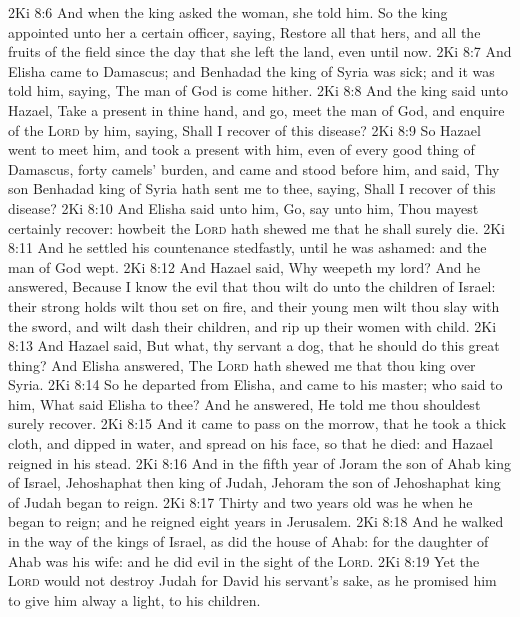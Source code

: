 \vs 2Ki 8:6 And when the king asked the woman, she told him. So the king appointed unto her a certain officer, saying, Restore all that  hers, and all the fruits of the field since the day that she left the land, even until now.
\vs 2Ki 8:7 And Elisha came to Damascus; and Benhadad the king of Syria was sick; and it was told him, saying, The man of God is come hither.
\vs 2Ki 8:8 And the king said unto Hazael, Take a present in thine hand, and go, meet the man of God, and enquire of the \textsc{Lord} by him, saying, Shall I recover of this disease?
\vs 2Ki 8:9 So Hazael went to meet him, and took a present with him, even of every good thing of Damascus, forty camels' burden, and came and stood before him, and said, Thy son Benhadad king of Syria hath sent me to thee, saying, Shall I recover of this disease?
\vs 2Ki 8:10 And Elisha said unto him, Go, say unto him, Thou mayest certainly recover: howbeit the \textsc{Lord} hath shewed me that he shall surely die.
\vs 2Ki 8:11 And he settled his countenance stedfastly, until he was ashamed: and the man of God wept.
\vs 2Ki 8:12 And Hazael said, Why weepeth my lord? And he answered, Because I know the evil that thou wilt do unto the children of Israel: their strong holds wilt thou set on fire, and their young men wilt thou slay with the sword, and wilt dash their children, and rip up their women with child.
\vs 2Ki 8:13 And Hazael said, But what,  thy servant a dog, that he should do this great thing? And Elisha answered, The \textsc{Lord} hath shewed me that thou  king over Syria.
\vs 2Ki 8:14 So he departed from Elisha, and came to his master; who said to him, What said Elisha to thee? And he answered, He told me  thou shouldest surely recover.
\vs 2Ki 8:15 And it came to pass on the morrow, that he took a thick cloth, and dipped  in water, and spread  on his face, so that he died: and Hazael reigned in his stead.
\vs 2Ki 8:16 And in the fifth year of Joram the son of Ahab king of Israel, Jehoshaphat  then king of Judah, Jehoram the son of Jehoshaphat king of Judah began to reign.
\vs 2Ki 8:17 Thirty and two years old was he when he began to reign; and he reigned eight years in Jerusalem.
\vs 2Ki 8:18 And he walked in the way of the kings of Israel, as did the house of Ahab: for the daughter of Ahab was his wife: and he did evil in the sight of the \textsc{Lord}.
\vs 2Ki 8:19 Yet the \textsc{Lord} would not destroy Judah for David his servant's sake, as he promised him to give him alway a light,  to his children.
